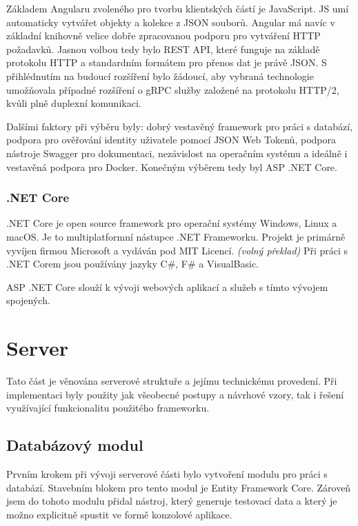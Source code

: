 \documentclass[
  glossaries,
]{kidiplom}
\begin{document}
Základem Angularu zvoleného pro tvorbu klientských částí je JavaScript. JS umí automaticky vytvářet objekty a kolekce z JSON souborů. Angular má navíc v základní knihovně velice dobře zpracovanou podporu pro vytváření HTTP požadavků. Jasnou volbou tedy bylo REST API, které funguje na základě protokolu HTTP a standardním formátem pro přenos dat je právě JSON. S přihlédnutím na budoucí rozšíření bylo žádoucí, aby vybraná technologie umožňovala případné rozšíření o gRPC služby založené na protokolu HTTP/2, kvůli plně duplexní komunikaci.

Dalšími faktory při výběru byly: dobrý vestavěný framework pro práci s databází, podpora pro ověřování identity uživatele pomocí JSON Web Tokenů, podpora nástroje Swagger pro dokumentaci, nezávislost na operačním systému a ideálně i vestavěná podpora pro Docker. Konečným výběrem tedy byl ASP .NET Core.

\subsubsection{.NET Core}
.NET Core je open source framework pro operační systémy Windows, Linux a macOS. Je to multiplatformní nástupce .NET Frameworku. Projekt je primárně vyvíjen firmou Microsoft a vydáván pod MIT Licencí. \cite{10} \textit{(volný překlad)} Při práci s .NET Corem jsou používány jazyky C\#, F\# a VisualBasic.

ASP .NET Core slouží k vývoji webových aplikací a služeb s tímto vývojem spojených.
\newpage
\section{Server}
Tato část je věnována serverové struktuře a jejímu technickému provedení. Při implementaci byly použity jak všeobecné postupy a návrhové vzory, tak i řešení využívající funkcionalitu použitého frameworku. 

\subsection{Databázový modul}
Prvním krokem při vývoji serverové části bylo vytvoření modulu pro práci s databází. Stavebním blokem pro tento modul je Entity Framework Core. Zároveň jsem do tohoto modulu přidal nástroj, který generuje testovací data a který je možno explicitně spustit ve formě konzolové aplikace.
\end{document}
